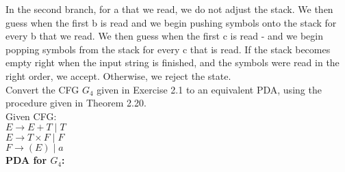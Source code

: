 \documentclass[12pt]{article}
\begin{document}
In the second branch, for a that we read, we do not adjust the stack. We then guess
when the first b is read and we begin pushing symbols onto the stack for every b that
we read. We then guess when the first c is read - and we begin popping symbols from the
stack for every c that is read. If the stack becomes empty right when the input string
is finished, and the symbols were read in the right order, we accept. Otherwise, we
reject the state. \\

\pagebreak
{} Convert the CFG $G_4$ given in Exercise 2.1 to an equivalent PDA, using the procedure given in Theorem 2.20. \\

\noindent
Given CFG: \\
$E \rightarrow E + T \; | \; T $ \\
$E \rightarrow T \times F \; | \; F $ \\
$F \rightarrow (E) \; | \; a $ \\

\noindent
\textbf{PDA for $G_4$:} \\
\end{document}

